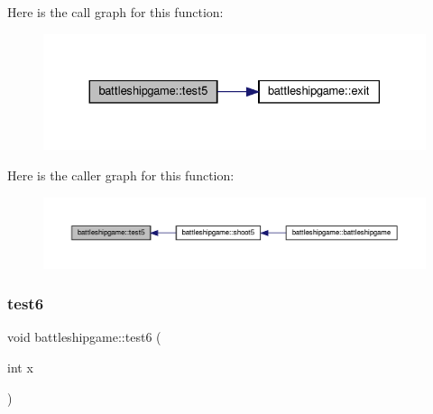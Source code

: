Here is the call graph for this function\+:
\nopagebreak
\begin{figure}[H]
\begin{center}
\leavevmode
\includegraphics[width=330pt]{classbattleshipgame_a0119d4f5935bdd98a5a974a4aa8bd5d0_cgraph}
\end{center}
\end{figure}
Here is the caller graph for this function\+:
\nopagebreak
\begin{figure}[H]
\begin{center}
\leavevmode
\includegraphics[width=350pt]{classbattleshipgame_a0119d4f5935bdd98a5a974a4aa8bd5d0_icgraph}
\end{center}
\end{figure}
\mbox{\label{classbattleshipgame_a15ad12d526ba36f2b951aca9005ec6f6}} 
\subsubsection{\texorpdfstring{test6}{test6}}
{\footnotesize\ttfamily void battleshipgame\+::test6 (\begin{DoxyParamCaption}\item[{int}]{x }\end{DoxyParamCaption})\hspace{0.3cm}{\ttfamily [slot]}}

